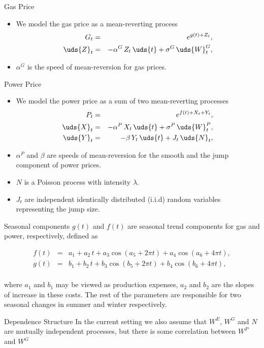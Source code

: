 {Gas Price}
\begin{itemize}
\item We model the gas price as a mean-reverting process
\begin{eqnarray}
G_t & = & e^{g(t) + Z_t},  \nonumber \\
\uds{Z}_t & = & -\alpha^G\,Z_t\,\uds{t} + \sigma^G\,\uds{W}^G_t,
\label{gas}
\end{eqnarray}
\item $\alpha^G$ is the speed of mean-reversion for gas prices.
\end{itemize}

{Power Price}
\begin{itemize}
\item We model the power price as a sum of two mean-reverting processes
\begin{eqnarray}
P_t & = & e^{f(t) + X_t + Y_t},  \nonumber \\
\uds{X}_t & = & -\alpha^P\,X_t\,\uds{t} + \sigma^P\,\uds{W}^P_t, \nonumber \\
\uds{Y}_t & = & -\beta\,Y_t\,\uds{t} + J_t\,\uds{N}_t,
\label{power}
\end{eqnarray}
\item $\alpha^P$ and $\beta$ are speeds of mean-reversion for the smooth and the jump component of power prices.
\item $N$ is a Poisson process with intensity $\lambda$.
\item $J_t$ are independent identically distributed (i.i.d) random variables representing the jump size.
\end{itemize}

{Seasonal components}
$g(t)$ and $f(t)$ are seasonal trend components for gas and power, respectively, defined as

\begin{eqnarray}
f(t) &=& a_1 + a_2\,t + a_3\cos(a_5 + 2\pi t) + a_4\cos(a_6 + 4\pi t), \nonumber \\
g(t) &=& b_1 + b_2\,t + b_3\cos(b_5 + 2\pi t) + b_4\cos(b_6 + 4\pi t), \nonumber \\
\label{grseasonality}
\end{eqnarray}

where $a_1$ and $b_1$ may be viewed as production expenses, $a_2$ and $b_2$ are the slopes of increase in these costs. The rest of the parameters are responsible for two seasonal changes in summer and winter respectively.

{Dependence Structure}
In the current setting we also assume that $W^E$, $W^G$ and $N$ are mutually independent processes, but there is some correlation between  $W^P$ and $W^G$

